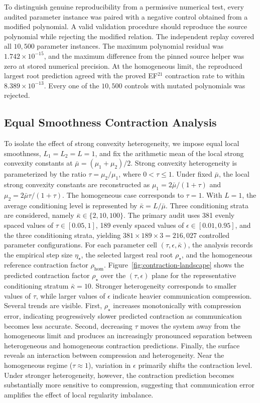 \documentclass[mathematics,article,submit,moreauthors]{Definitions/mdpi}
\begin{document}
To distinguish genuine reproducibility from a permissive numerical test, every audited parameter instance was paired with a negative control obtained from a modified polynomial. A valid validation procedure should reproduce the source polynomial while rejecting the modified relation. The independent replay covered all \(10{,}500\) parameter instances. The maximum polynomial residual was \(1.742\times10^{-15}\), and the maximum difference from the pinned source helper was zero at stored numerical precision. At the homogeneous limit, the reproduced largest root prediction agreed with the proved EF$^{21}$ contraction rate to within \(8.389\times10^{-13}\). Every one of the $10{,}500$ controls with mutated polynomials was rejected.

\subsection{Equal Smoothness Contraction Analysis} 
To isolate the effect of strong convexity heterogeneity, we impose equal local smoothness, \(L_1=L_2=L=1\), and fix the arithmetic mean of the local strong convexity constants at \(\bar{\mu}=(\mu_1+\mu_2)/2\). Strong convexity heterogeneity is parameterized by the ratio \(\tau=\mu_2/\mu_1\), where \(0<\tau\le1\). Under fixed \(\bar{\mu}\), the local strong convexity constants are reconstructed as \(\mu_1=2\bar{\mu}/(1+\tau)\) and \(\mu_2=2\bar{\mu}\tau/(1+\tau)\). The homogeneous case corresponds to \(\tau=1\). With \(L=1\), the average conditioning level is represented by \(\bar{\kappa}=L/\bar{\mu}\). Three conditioning strata are considered, namely \(\bar{\kappa}\in\{2,10,100\}\). The primary audit uses 381 evenly spaced values of \(\tau\in[0.05,1]\), 189 evenly spaced values of \(\epsilon\in[0.01,0.95]\), and the three conditioning strata, yielding \(381\times189\times3=216{,}027\) controlled parameter configurations. For each parameter cell \((\tau,\epsilon,\bar{\kappa})\), the analysis records the empirical step size \(\eta_\star\), the selected largest real root \(\rho_\star\), and the homogeneous reference contraction factor \(\rho_{\mathrm{hom}}\). Figure~\ref{fig:contraction-landscape} shows the predicted contraction factor \(\rho_\star\) over the \((\tau,\epsilon)\) plane for the representative conditioning stratum \(\bar{\kappa}=10\). Stronger heterogeneity corresponds to smaller values of \(\tau\), while larger values of \(\epsilon\) indicate heavier communication compression. Several trends are visible. First, \(\rho_\star\) increases monotonically with compression error, indicating progressively slower predicted contraction as communication becomes less accurate. Second, decreasing \(\tau\) moves the system away from the homogeneous limit and produces an increasingly pronounced separation between heterogeneous and homogeneous contraction predictions. Finally, the surface reveals an interaction between compression and heterogeneity. Near the homogeneous regime (\(\tau\approx1\)), variation in \(\epsilon\) primarily shifts the contraction level. Under stronger heterogeneity, however, the contraction prediction becomes substantially more sensitive to compression, suggesting that communication error amplifies the effect of local regularity imbalance. 
\end{document}
